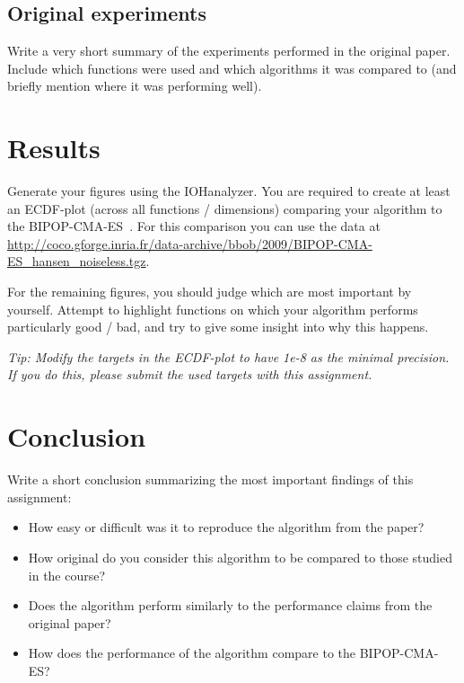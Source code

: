 \documentclass[runningheads]{llncs}
\begin{document}
\subsection{Original experiments}
Write a very short summary of the experiments performed in the original paper. Include which functions were used and which algorithms it was compared to (and briefly mention where it was performing well).

\section{Results}
Generate your figures using the IOHanalyzer. You are required to create at least an ECDF-plot (across all functions / dimensions) comparing your algorithm to the BIPOP-CMA-ES~\cite{COCOperformace}. For this comparison you can use the data at \url{http://coco.gforge.inria.fr/data-archive/bbob/2009/BIPOP-CMA-ES_hansen_noiseless.tgz}.

For the remaining figures, you should judge which are most important by yourself. Attempt to highlight functions on which your algorithm performs particularly good / bad, and try to give some insight into why this happens.

\textit{Tip: Modify the targets in the ECDF-plot to have 1e-8 as the minimal precision. If you do this, please submit the used targets with this assignment.}

\section{Conclusion}
Write a short conclusion summarizing the most important findings of this assignment:
\begin{itemize}
    \item How easy or difficult was it to reproduce the algorithm from the paper?
    \item How original do you consider this algorithm to be compared to those studied in the course?
    \item Does the algorithm perform similarly to the performance claims from the original paper?
    \item How does the performance of the algorithm compare to the BIPOP-CMA-ES?
\end{itemize}






\appendix
\end{document}
